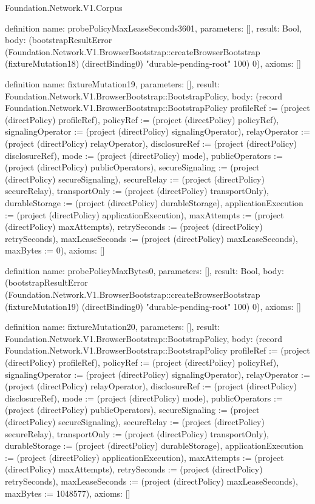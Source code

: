 \begin{lexlean}{Foundation.Network.V1.Corpus}
\begin{semanticmodule}
definition{
  name: probePolicyMaxLeaseSeconds3601,
  parameters: [],
  result: Bool,
  body: (bootstrapResultError (Foundation.Network.V1.BrowserBootstrap::createBrowserBootstrap (fixtureMutation18) (directBinding0) "durable-pending-root" 100) 0),
  axioms: []
}

definition{
  name: fixtureMutation19,
  parameters: [],
  result: Foundation.Network.V1.BrowserBootstrap::BootstrapPolicy,
  body: (record Foundation.Network.V1.BrowserBootstrap::BootstrapPolicy {profileRef := (project (directPolicy) profileRef), policyRef := (project (directPolicy) policyRef), signalingOperator := (project (directPolicy) signalingOperator), relayOperator := (project (directPolicy) relayOperator), disclosureRef := (project (directPolicy) disclosureRef), mode := (project (directPolicy) mode), publicOperators := (project (directPolicy) publicOperators), secureSignaling := (project (directPolicy) secureSignaling), secureRelay := (project (directPolicy) secureRelay), transportOnly := (project (directPolicy) transportOnly), durableStorage := (project (directPolicy) durableStorage), applicationExecution := (project (directPolicy) applicationExecution), maxAttempts := (project (directPolicy) maxAttempts), retrySeconds := (project (directPolicy) retrySeconds), maxLeaseSeconds := (project (directPolicy) maxLeaseSeconds), maxBytes := 0}),
  axioms: []
}

definition{
  name: probePolicyMaxBytes0,
  parameters: [],
  result: Bool,
  body: (bootstrapResultError (Foundation.Network.V1.BrowserBootstrap::createBrowserBootstrap (fixtureMutation19) (directBinding0) "durable-pending-root" 100) 0),
  axioms: []
}

definition{
  name: fixtureMutation20,
  parameters: [],
  result: Foundation.Network.V1.BrowserBootstrap::BootstrapPolicy,
  body: (record Foundation.Network.V1.BrowserBootstrap::BootstrapPolicy {profileRef := (project (directPolicy) profileRef), policyRef := (project (directPolicy) policyRef), signalingOperator := (project (directPolicy) signalingOperator), relayOperator := (project (directPolicy) relayOperator), disclosureRef := (project (directPolicy) disclosureRef), mode := (project (directPolicy) mode), publicOperators := (project (directPolicy) publicOperators), secureSignaling := (project (directPolicy) secureSignaling), secureRelay := (project (directPolicy) secureRelay), transportOnly := (project (directPolicy) transportOnly), durableStorage := (project (directPolicy) durableStorage), applicationExecution := (project (directPolicy) applicationExecution), maxAttempts := (project (directPolicy) maxAttempts), retrySeconds := (project (directPolicy) retrySeconds), maxLeaseSeconds := (project (directPolicy) maxLeaseSeconds), maxBytes := 1048577}),
  axioms: []
}


\end{semanticmodule}
\end{lexlean}
